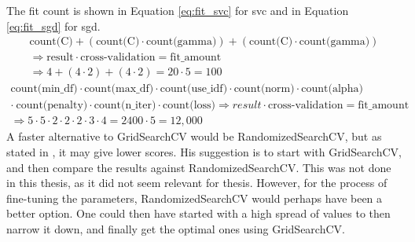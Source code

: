 The fit count is shown in Equation \ref{eq:fit_svc} for \gls{svc} and in Equation \ref{eq:fit_sgd} for \gls{sgd}.
\begin{equation}\label{eq:fit_svc}
\begin{split}
\text{count(C)} + (\text{count(C)} \cdot \text{count(gamma)}) + (\text{count(C)} \cdot \text{count(gamma)}) \\
\Longrightarrow  \text{result} \cdot \text{cross-validation} = \text{fit\_amount} \\
\Longrightarrow  4 + (4 \cdot 2) + (4 \cdot 2) = 20 \cdot 5 = 100 
\end{split}
\end{equation}
\begin{equation}\label{eq:fit_sgd}
\begin{split}
\text{count(min\_df)} \cdot \text{count(max\_df)} \cdot \text{count(use\_idf)} \cdot \text{count(norm)} \cdot \text{count(alpha)} \\ 
\cdot ~ \text{count(penalty)} \cdot \text{count(n\_iter)} \cdot \text{count(loss)} \Longrightarrow  result \cdot \text{cross-validation} = \text{fit\_amount} \\
\Longrightarrow  5 \cdot 5 \cdot 2 \cdot 2 \cdot 2 \cdot 3 \cdot 4 = 2400 \cdot 5 = 12,000
\end{split}
\end{equation}
A faster alternative to GridSearchCV would be RandomizedSearchCV, but as stated in \cite{Markham2015a}, it may give lower scores. 
His suggestion is to start with GridSearchCV, and then compare the results against RandomizedSearchCV.
This was not done in this thesis, as it did not seem relevant for thesis.
However, for the process of fine-tuning the parameters, RandomizedSearchCV would perhaps have been a better option. 
One could then have started with a high spread of values to then narrow it down, and finally get the optimal ones using GridSearchCV.
 

